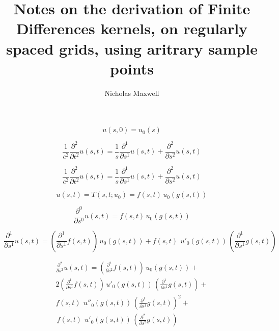 \documentclass[amsmath,amssymb,floatfix]{revtex4}
\numberwithin{equation}{section}
\newcommand{\pd}[2]{\frac{ \partial ^ #2}{ \partial #1 ^ #2}  }
\begin{document}
\title{Notes on the derivation of Finite Differences kernels, on regularly spaced grids, using aritrary sample points}

\author{Nicholas Maxwell}





\maketitle




\begin{equation}
	u{(s,0)} =  u_0{(s)} 
\end{equation}



\begin{equation}
	\frac{1}{c^2} \pd{t}{2} u{(s,t)} = \frac{1}{s} \pd{s}{1} u{(s,t)} + \pd{s}{2} u{(s,t)}
\end{equation}

\begin{equation}
	\frac{1}{c^2} \pd{t}{2} u{(s,t)} = \frac{1}{s} \pd{s}{1} u{(s,t)} + \pd{s}{2} u{(s,t)}
\end{equation}

\begin{equation}
	u{(s,t)} = T (s,t;u_0) = f(s,t)\, u_0(g(s,t))
\end{equation}



\begin{equation}
	\pd{s}{0} u{(s,t)} = f(s,t)\, u_0(g(s,t))  
\end{equation}

\begin{equation}
	\pd{s}{1} u{(s,t)} =
	 \left( \pd{s}{1} f(s,t) \right) \,  u_0(g(s,t)) + 
	  f(s,t) \ \, u'_0(g(s,t)) \, \left( \pd{s}{1} g(s,t)\right)	  
\end{equation}


\begin{eqnarray*}	  
	\pd{s}{2} u{(s,t)} =
	 \left( \pd{s}{2} f(s,t) \right) \,  u_0(g(s,t)) + \\
	 2 \left( \pd{s}{1} f(s,t) \right)  \, u'_0(g(s,t)) \, \left( \pd{s}{1} g(s,t)\right) + \\
	   f(s,t) \ \, u''_0(g(s,t)) \, \left( \pd{s}{1} g(s,t)\right)^2 + \\
		\, f(s,t) \ \, u'_0(g(s,t)) \, \left( \pd{s}{2} g(s,t)\right) \\
\end{eqnarray*}
\end{document}
